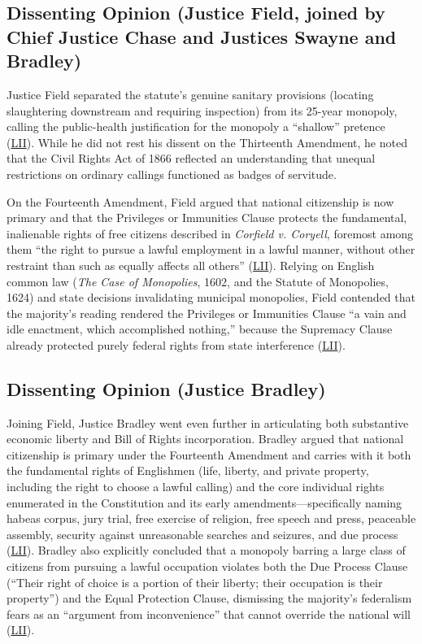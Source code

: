 \documentclass[12pt]{article}
\begin{document}
\subsection{Dissenting Opinion (Justice Field, joined by Chief Justice Chase and Justices Swayne and Bradley)}

Justice Field separated the statute's genuine sanitary provisions (locating slaughtering downstream and requiring inspection) from its 25-year monopoly, calling the public-health justification for the monopoly a ``shallow'' pretence (\href{https://www.law.cornell.edu/supremecourt/text/83/36}{LII}). While he did not rest his dissent on the Thirteenth Amendment, he noted that the Civil Rights Act of 1866 reflected an understanding that unequal restrictions on ordinary callings functioned as badges of servitude.

On the Fourteenth Amendment, Field argued that national citizenship is now primary and that the Privileges or Immunities Clause protects the fundamental, inalienable rights of free citizens described in \textit{Corfield v. Coryell}, foremost among them ``the right to pursue a lawful employment in a lawful manner, without other restraint than such as equally affects all others'' (\href{https://www.law.cornell.edu/supremecourt/text/83/36}{LII}). Relying on English common law (\textit{The Case of Monopolies}, 1602, and the Statute of Monopolies, 1624) and state decisions invalidating municipal monopolies, Field contended that the majority's reading rendered the Privileges or Immunities Clause ``a vain and idle enactment, which accomplished nothing,'' because the Supremacy Clause already protected purely federal rights from state interference (\href{https://www.law.cornell.edu/supremecourt/text/83/36}{LII}).

\subsection{Dissenting Opinion (Justice Bradley)}

Joining Field, Justice Bradley went even further in articulating both substantive economic liberty and Bill of Rights incorporation. Bradley argued that national citizenship is primary under the Fourteenth Amendment and carries with it both the fundamental rights of Englishmen (life, liberty, and private property, including the right to choose a lawful calling) and the core individual rights enumerated in the Constitution and its early amendments---specifically naming habeas corpus, jury trial, free exercise of religion, free speech and press, peaceable assembly, security against unreasonable searches and seizures, and due process (\href{https://www.law.cornell.edu/supremecourt/text/83/36}{LII}). Bradley also explicitly concluded that a monopoly barring a large class of citizens from pursuing a lawful occupation violates both the Due Process Clause (``Their right of choice is a portion of their liberty; their occupation is their property'') and the Equal Protection Clause, dismissing the majority's federalism fears as an ``argument from inconvenience'' that cannot override the national will (\href{https://www.law.cornell.edu/supremecourt/text/83/36}{LII}).
\end{document}
